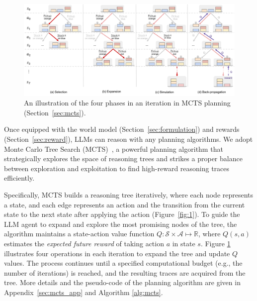\begin{figure}[t]
    \centering
    \includegraphics[width=\textwidth]{sections/mcts_phases.pdf}
    \vspace{-25pt}
    \caption{An illustration of the four phases in an iteration in MCTS planning (Section~\ref{sec:mcts}).}
    \label{fig:mcts_phases}
    \vspace{-12pt}
\end{figure}


Once equipped with the world model (Section~\ref{sec:formulation}) and rewards (Section~\ref{sec:reward}), LLMs can reason with any planning algorithms. We adopt Monte Carlo Tree Search (MCTS)~\cite{kocsis2006bandit, coulom2007efficient}, a powerful planning algorithm that strategically explores the space of reasoning trees and strikes a proper balance between exploration and exploitation to find high-reward reasoning traces efficiently.

Specifically, MCTS builds a reasoning tree iteratively, where each node represents a state, and each edge represents an action and the transition from the current state to the next state after applying the action (Figure~\ref{fig:1}).
To guide the LLM agent to expand and explore the most promising nodes of the tree, the algorithm maintains a state-action value function $Q : \mathcal S \times \mathcal A \mapsto \mathbb R$, where $Q(s, a)$ estimates the \emph{expected future reward} of taking action $a$ in state $s$. Figure \ref{fig:mcts_phases} illustrates four operations in each iteration to expand the tree and update $Q$ values. The process continues until a specified computational budget (e.g., the number of iterations) is reached, and the resulting traces are acquired from the tree. More details and the pseudo-code of the planning algorithm are given in Appendix~\ref{sec:mcts_app} and Algorithm \ref{alg:mcts}.




